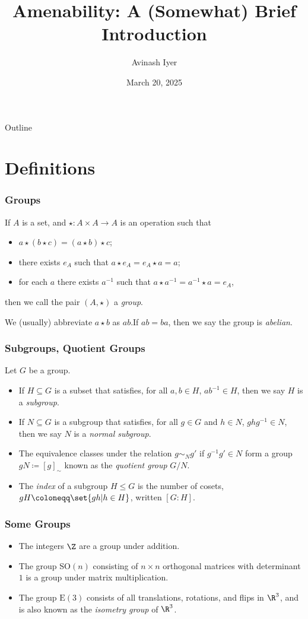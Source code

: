 \documentclass{beamer-custom}
\title{Amenability: A (Somewhat) Brief Introduction}
\author{Avinash Iyer}
\institute{Occidental College}
\date{March 20, 2025}
\begin{document}
\begin{frame}
    \titlepage
\end{frame}

\begin{frame}{Outline}
    \tableofcontents
\end{frame}
\section{Definitions}%
\begin{frame}
  \frametitle{Groups}
  If $A$ is a set, and $\star\colon A\times A \rightarrow A$ is an operation such that
  \begin{itemize}
    \item $a\star\left(b\star c\right) = \left(a\star b\right)\star c$;\pause
    \item there exists $e_A$ such that $a\star e_A = e_A\star a = a$;\pause
    \item for each $a$ there exists $a^{-1}$ such that $a\star a^{-1} = a^{-1}\star a = e_A$,\pause
  \end{itemize}
  then we call the pair $\left(A,\star\right)$ a \textit{group}.\pause\hfill\break

  We (usually) abbreviate $a\star b$ as $ab$.\pause\:If $ab = ba$, then we say the group is \textit{abelian}.
\end{frame}
\begin{frame}
  \frametitle{Subgroups, Quotient Groups}
  Let $G$ be a group.
  \begin{itemize}
    \item If $H\subseteq G$ is a subset that satisfies, for all $a,b\in H$, $ab^{-1}\in H$, then we say $H$ is a \textit{subgroup}.\pause
    \item If $N\subseteq G$ is a subgroup that satisfies, for all $g\in G$ and $h\in N$, $ghg^{-1}\in N$, then we say $N$ is a \textit{normal subgroup}.\pause
    \item The equivalence classes under the relation $g\sim_{N} g'$ if $g^{-1}g' \in N$ form a group $gN\coloneqq \left[ g \right]_{\sim}$ known as the \textit{quotient group} $G/N$.\pause
    \item The \textit{index} of a subgroup $H\leq G$ is the number of cosets, $gH\coloneqq \set{gh | h\in H}$, written $\left[ G:H \right]$.
  \end{itemize}
\end{frame}
\begin{frame}
  \frametitle{Some Groups}
  \begin{itemize}
    \item The integers $\Z$ are a group under addition.\pause
    \item The group $\text{SO}(n)$ consisting of $n\times n$ orthogonal matrices with determinant $1$ is a group under matrix multiplication.\pause
    \item The group $\text{E}\left( 3 \right)$ consists of all translations, rotations, and flips in $\R^3$, and is also known as the \textit{isometry group} of $\R^3$.
  \end{itemize}
\end{frame}
\end{document}
